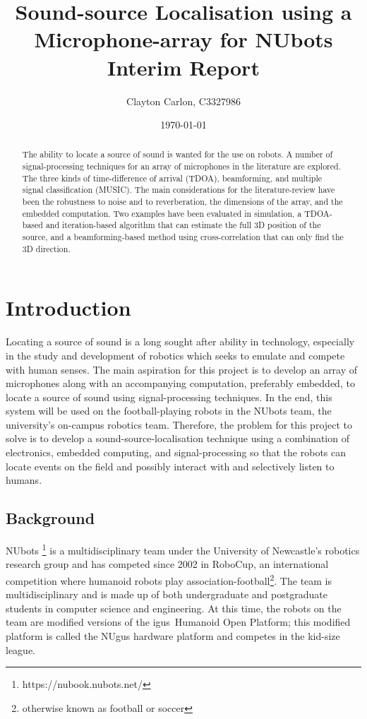 \documentclass[notitlepage]{report}
\title{
	Sound-source Localisation using a Microphone-array for NUbots\\
	Interim Report
}
\author{Clayton Carlon, C3327986}
\date{\today}
\begin{document}
\maketitle
\begin{abstract}
The ability to locate a source of sound is wanted for the use on robots. A number of signal-processing techniques for an array of microphones in the literature are explored. The three kinds of time-difference of arrival (TDOA), beamforming, and multiple signal classification (MUSIC). The main considerations for the literature-review have been the robustness to noise and to reverberation, the dimensions of the array, and the embedded computation. Two examples have been evaluated in simulation, a TDOA-based and iteration-based algorithm that can estimate the full 3D position of the source, and a beamforming-based method using cross-correlation that can only find the 3D direction.
\end{abstract}

\tableofcontents

\chapter{Introduction}

Locating a source of sound is a long sought after ability in technology, especially in the study and development of robotics which seeks to emulate and compete with human senses. The main aspiration for this project is to develop an array of microphones along with an accompanying computation, preferably embedded, to locate a source of sound using signal-processing techniques. In the end, this system will be used on the football-playing robots in the NUbots team, the university's on-campus robotics team. Therefore, the problem for this project to solve is to develop a sound-source-localisation technique using a combination of electronics, embedded computing, and signal-processing so that the robots can locate events on the field and possibly interact with and selectively listen to humans.

\section{Background}

NUbots \footnote{https://nubook.nubots.net/} is a multidisciplinary team under the University of Newcastle's robotics research group and has competed since 2002 in RoboCup, an international competition where humanoid robots play association-football\footnote{otherwise known as football or soccer}. The team is multidisciplinary and is made up of both undergraduate and postgraduate students in computer science and engineering. At this time, the robots on the team are modified versions of the igus\textregistered\ Humanoid Open Platform; this modified platform is called the NUgus hardware platform and competes in the kid-size league.
\end{document}
